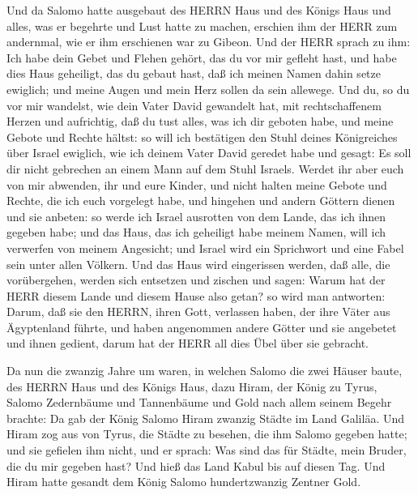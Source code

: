  Und da Salomo hatte ausgebaut des HERRN Haus und des Königs
Haus und alles, was er begehrte und Lust hatte zu machen, 
erschien ihm der HERR zum andernmal, wie er ihm erschienen war zu
Gibeon.  Und der HERR sprach zu ihm: Ich habe dein Gebet und
Flehen gehört, das du vor mir gefleht hast, und habe dies Haus
geheiligt, das du gebaut hast, daß ich meinen Namen dahin setze
ewiglich; und meine Augen und mein Herz sollen da sein allewege.
 Und du, so du vor mir wandelst, wie dein Vater David
gewandelt hat, mit rechtschaffenem Herzen und aufrichtig, daß du tust
alles, was ich dir geboten habe, und meine Gebote und Rechte hältst:
 so will ich bestätigen den Stuhl deines Königreiches über
Israel ewiglich, wie ich deinem Vater David geredet habe und gesagt: Es
soll dir nicht gebrechen an einem Mann auf dem Stuhl Israels.
 Werdet ihr aber euch von mir abwenden, ihr und eure Kinder,
und nicht halten meine Gebote und Rechte, die ich euch vorgelegt habe,
und hingehen und andern Göttern dienen und sie anbeten:  so
werde ich Israel ausrotten von dem Lande, das ich ihnen gegeben habe;
und das Haus, das ich geheiligt habe meinem Namen, will ich verwerfen
von meinem Angesicht; und Israel wird ein Sprichwort und eine Fabel sein
unter allen Völkern.  Und das Haus wird eingerissen werden,
daß alle, die vorübergehen, werden sich entsetzen und zischen und sagen:
Warum hat der HERR diesem Lande und diesem Hause also getan?
 so wird man antworten: Darum, daß sie den HERRN, ihren
Gott, verlassen haben, der ihre Väter aus Ägyptenland führte, und haben
angenommen andere Götter und sie angebetet und ihnen gedient, darum hat
der HERR all dies Übel über sie gebracht.

 Da nun die zwanzig Jahre um waren, in welchen Salomo die
zwei Häuser baute, des HERRN Haus und des Königs Haus, 
dazu Hiram, der König zu Tyrus, Salomo Zedernbäume und Tannenbäume und
Gold nach allem seinem Begehr brachte: Da gab der König Salomo Hiram
zwanzig Städte im Land Galiläa.  Und Hiram zog aus von
Tyrus, die Städte zu besehen, die ihm Salomo gegeben hatte; und sie
gefielen ihm nicht,  und er sprach: Was sind das für
Städte, mein Bruder, die du mir gegeben hast? Und hieß das Land Kabul
bis auf diesen Tag.  Und Hiram hatte gesandt dem König
Salomo hundertzwanzig Zentner Gold.

